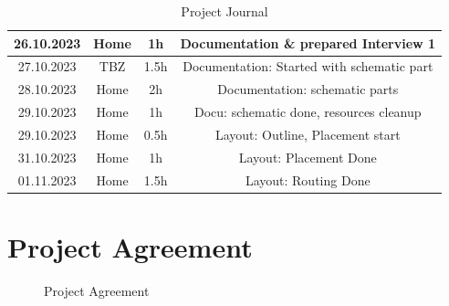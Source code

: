 \begin{table}[H]
\begin{tabular}{||c | c | c || c||}
 \hline
   26.10.2023 & Home & 1h & Documentation \& prepared Interview 1 \\ 
 \hline
  27.10.2023 & TBZ & 1.5h & Documentation: Started with schematic part \\ 
 \hline
  28.10.2023 & Home & 2h & Documentation: schematic parts \\ 
 \hline
  29.10.2023 & Home & 1h & Docu: schematic done, resources cleanup \\ 
 \hline
   29.10.2023 & Home & 0.5h & Layout: Outline, Placement start \\ 
 \hline
   31.10.2023 & Home & 1h & Layout: Placement Done \\ 
 \hline   
   01.11.2023 & Home & 1.5h & Layout: Routing Done \\ 
 \hline
\end{tabular}
    \caption{Project Journal}\label{tab:Project Journal}
\end{table}
\newpage

\section{Project Agreement}
\label{sec:Project Agreement}
\begin{figure}[H]
  \label{fig:Project Agreement}
	\centering
	\caption{Project Agreement}
\end{figure}
\newpage

